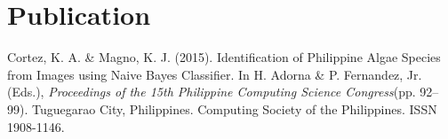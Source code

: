 \documentclass[top=0in]{deedy-resume-openfont}
\begin{document}
\begin{minipage}[t]{0.66\textwidth}
\section{Publication}\label{sec:publications}
\renewcommand\refname{\vskip -1.5em} %
Cortez, K. A. \& Magno, K. J. (2015). Identification of Philippine Algae Species from Images using Naive Bayes Classifier.
In H. Adorna \& P. Fernandez, Jr. (Eds.), \textit{Proceedings of the 15th Philippine Computing Science Congress}(pp. 92--99).
Tuguegarao City, Philippines. Computing Society of the Philippines. ISSN 1908-1146.
%
%

\end{minipage} 
\end{document}
